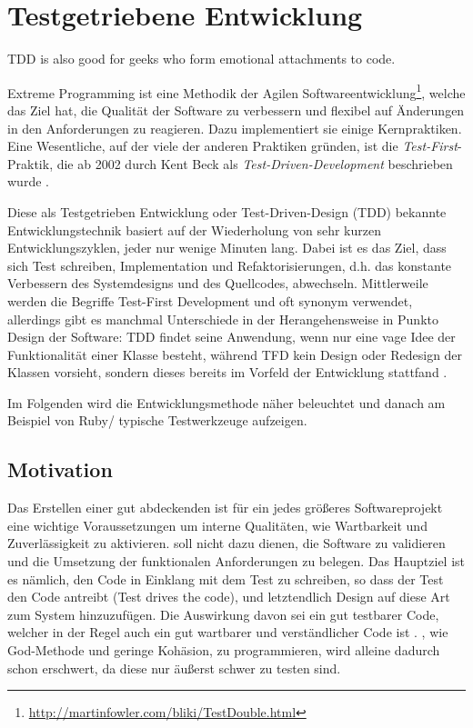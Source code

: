 \chapter{Testgetriebene Entwicklung}
\label{sec:tdd}

\epigraph{TDD is also good for geeks who form emotional attachments to code. }{\cite{beck_test_2002}}Extreme Programming ist eine Methodik der Agilen Softwareentwicklung\footnote{\url{http://martinfowler.com/bliki/TestDouble.html}}, welche das Ziel hat, die Qualität der Software zu verbessern und flexibel auf Änderungen in den Anforderungen zu reagieren. Dazu implementiert sie einige Kernpraktiken. Eine Wesentliche, auf der viele der anderen Praktiken gründen, ist die \textit{Test-First}-Praktik, die ab 2002 durch Kent Beck als \textit{Test-Driven-Development} beschrieben wurde \citep{beck_test_2002}.

Diese als Testgetrieben Entwicklung oder Test-Driven-Design (TDD) bekannte Entwicklungstechnik basiert auf der Wiederholung von sehr kurzen Entwicklungszyklen, jeder nur wenige Minuten lang. Dabei ist es das Ziel, dass sich Test schreiben, Implementation und Refaktorisierungen, d.h. das konstante Verbessern des Systemdesigns und des Quellcodes, abwechseln. Mittlerweile werden die Begriffe Test-First Development und  oft synonym verwendet, allerdings gibt es manchmal Unterschiede in der Herangehensweise in Punkto Design der Software: TDD findet seine Anwendung, wenn nur eine vage Idee der Funktionalität einer Klasse besteht, während TFD kein Design oder Redesign der Klassen vorsieht, sondern dieses bereits im Vorfeld der Entwicklung stattfand \citep{stackoverflow_testing_2008}.


Im Folgenden wird die Entwicklungsmethode  näher beleuchtet und danach am Beispiel von Ruby/ typische Testwerkzeuge aufzeigen.




\section{Motivation}
 Das Erstellen einer gut abdeckenden  ist für ein jedes größeres Softwareprojekt eine wichtige Voraussetzungen um interne Qualitäten, wie Wartbarkeit und Zuverlässigkeit zu aktivieren.  soll nicht dazu dienen, die Software zu validieren und die Umsetzung der funktionalen Anforderungen zu belegen. Das Hauptziel ist es nämlich, den Code in Einklang mit dem Test zu schreiben, so dass der Test den Code antreibt (Test drives the code), und letztendlich Design auf diese Art zum System hinzuzufügen. Die Auswirkung davon sei ein gut testbarer Code, welcher in der Regel auch ein gut wartbarer und verständlicher Code ist \citep{beck_test_2002}. , wie God-Methode und geringe Kohäsion, zu programmieren, wird alleine dadurch schon erschwert, da diese nur äußerst schwer zu testen sind.



